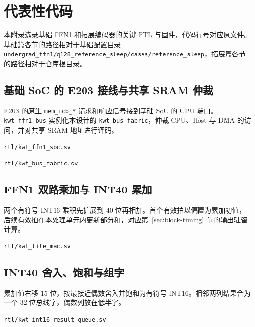 \documentclass[UTF8,a4paper,zihao=-4,fontset=none,openany,oneside]{ctexrep}
\begin{document}
\chapter{代表性代码}\label{app:representative-code}

本附录选录基础 FFN1 和拓展编码器的关键 RTL 与固件，代码行号对应原文件。基础篇各节的路径相对于基础配置目录
\texttt{undergrad\_\allowbreak{}ffn1/\allowbreak{}q128\_\allowbreak{}reference\_\allowbreak{}sleep/\allowbreak{}cases/\allowbreak{}reference\_\allowbreak{}sleep}，拓展篇各节的路径相对于仓库根目录。

\section{基础 SoC 的 E203 接线与共享 SRAM 仲裁}
E203 的原生 \texttt{mem\_icb\_*} 请求和响应信号接到基础 SoC 的 CPU 端口。\texttt{kwt\_ffn1\_bus} 实例化本设计的 \texttt{kwt\_bus\_fabric}，仲裁 CPU、Host 与 DMA 的访问，并对共享 SRAM 地址进行译码。
\par\noindent\texttt{rtl/kwt\_ffn1\_soc.sv}

\par\noindent\texttt{rtl/kwt\_bus\_fabric.sv}


\clearpage

\section{FFN1 双路乘加与 INT40 累加}
两个有符号 INT16 乘积先扩展到 40 位再相加。首个有效拍以偏置为累加初值，后续有效拍在本处理单元内更新部分和，对应第~\ref{sec:block-timing} 节的输出驻留计算。
\par\noindent\texttt{rtl/kwt\_tile\_mac.sv}


\clearpage
\section{INT40 舍入、饱和与组字}
累加值右移 15 位，按最接近偶数舍入并饱和为有符号 INT16。相邻两列结果合为一个 32 位总线字，偶数列放在低半字。
\par\noindent\texttt{rtl/kwt\_int16\_result\_queue.sv}

\end{document}
